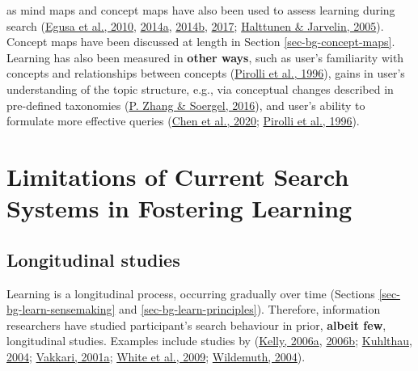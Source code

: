 \documentclass[letterpaper, nobind]{templates/ociamthesis}
\begin{document}
as mind maps and concept maps have also been used to assess learning
during search
(\protect\hyperlink{ref-egusa2010usingb}{Egusa et al., 2010}, \protect\hyperlink{ref-egusa2014howd}{2014a}, \protect\hyperlink{ref-egusa2014howe}{2014b}, \protect\hyperlink{ref-egusa2017evaluating}{2017}; \protect\hyperlink{ref-halttunen2005assessing}{Halttunen \& Jarvelin, 2005}).
Concept maps have been discussed at length in Section \ref{sec-bg-concept-maps}. Learning has also been measured in
\textbf{other ways}, such as user's familiarity with concepts and
relationships between concepts (\protect\hyperlink{ref-pirolli1996scatter}{Pirolli et al., 1996}), gains in user's
understanding of the topic structure, e.g., via conceptual changes
described in pre-defined taxonomies (\protect\hyperlink{ref-zhang2016process}{P. Zhang \& Soergel, 2016}), and user's
ability to formulate more effective queries
(\protect\hyperlink{ref-chen2020understanding}{Chen et al., 2020}; \protect\hyperlink{ref-pirolli1996scatter}{Pirolli et al., 1996}).

\hypertarget{limitations-of-current-search-systems-in-fostering-learning}{%
\section{Limitations of Current Search Systems in Fostering Learning}\label{limitations-of-current-search-systems-in-fostering-learning}}

\hypertarget{sec-bg-search-longitudinal-studies}{%
\subsection{Longitudinal studies}\label{sec-bg-search-longitudinal-studies}}

Learning is a longitudinal process, occurring gradually over time
(Sections \ref{sec-bg-learn-sensemaking} and \ref{sec-bg-learn-principles}). Therefore, information
researchers have studied participant's search behaviour in prior,
\textbf{albeit few}, longitudinal studies. Examples include studies by
(\protect\hyperlink{ref-kelly2006measuringa}{Kelly, 2006a}, \protect\hyperlink{ref-kelly2006measuringb}{2006b}; \protect\hyperlink{ref-kuhlthau2004seeking}{Kuhlthau, 2004}; \protect\hyperlink{ref-vakkari2001changes}{Vakkari, 2001a}; \protect\hyperlink{ref-white2009characterizing}{White et al., 2009}; \protect\hyperlink{ref-wildemuth2004effects}{Wildemuth, 2004}).
\end{document}
